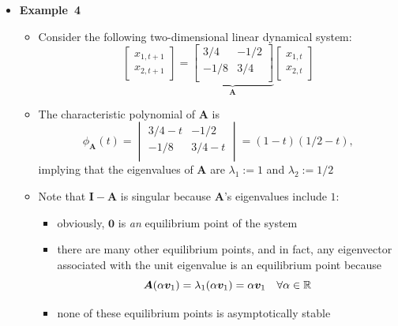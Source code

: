 \documentclass[12pt,a4paper]{article}
\begin{document}
\begin{itemize}
\item \textbf{Example~4}
  \begin{itemize}
  \item Consider the following two-dimensional linear dynamical system:
    \begin{equation}\nonumber%
      \begin{bmatrix}
        x_{1,t+1} \\
        x_{2,t+1}
      \end{bmatrix}
      =
      \underbrace{
      \begin{bmatrix}
        3/4 & -1/2 \\
        -1/8 & 3/4 \\
      \end{bmatrix}}_{\bm{A}}
      \begin{bmatrix}
        x_{1,t} \\
        x_{2,t}
      \end{bmatrix}
    \end{equation}
  \item The characteristic polynomial of $\bm{A}$ is
    \begin{equation}\nonumber%
      \phi_{\bm{A}}(t) = 
      \begin{vmatrix}
        3/4 - t & -1/2 \\
        -1/8 & 3/4 - t \\
      \end{vmatrix}
      = (1-t)(1/2-t),
    \end{equation}
    implying that
    the eigenvalues of $\bm{A}$ are $\lambda_{1}:=1$ and $\lambda_{2}:=1/2$

  \item Note that $\bm{I}-\bm{A}$ is singular
    because $\bm{A}$'s eigenvalues include $1$:
    \begin{itemize}
    \item obviously, $\bm{0}$ is \emph{an} equilibrium point of the system
    \item there are many other equilibrium points, and in fact,
      any eigenvector associated with the unit eigenvalue is an equilibrium point because
      \begin{equation}\nonumber%
        \bm{A}(\alpha\bm{v}_{1}) = \lambda_{1}(\alpha\bm{v}_{1}) = \alpha\bm{v}_{1}
        \quad \forall \alpha\in \R
      \end{equation}
    \item none of these equilibrium points is asymptotically stable
    \end{itemize}
    

\end{itemize}
\end{itemize}
\end{document}
